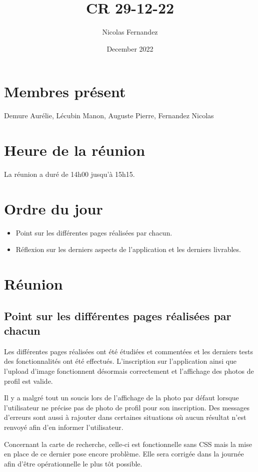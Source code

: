 \documentclass{report}
\title{CR 29-12-22}
\author{Nicolas Fernandez}
\date{December 2022}
\begin{document}
\maketitle

\section{Membres présent}
Demure Aurélie, Lécubin Manon, Auguste Pierre, Fernandez Nicolas

\section{Heure de la réunion}

La réunion a duré de 14h00 jusqu'à 15h15.

\section{Ordre du jour}

\begin{itemize}
    \item Point sur les différentes pages réalisées par chacun.
    \item Réflexion sur les derniers aspects de l'application et les derniers livrables.
\end{itemize}

\section{Réunion}
\subsection{Point sur les différentes pages réalisées par chacun}

Les différentes pages réalisées ont été étudiées et commentées et les derniers tests des fonctionnalités ont été effectués. L'inscription sur l'application ainsi que l'upload d'image fonctionnent désormais correctement et l'affichage des photos de profil est valide. 

Il y a malgré tout un soucis lors de l'affichage de la photo par défaut lorsque l'utilisateur ne précise pas de photo de profil pour son inscription. Des messages d'erreurs sont aussi à rajouter dans certaines situations où aucun résultat n'est renvoyé afin d'en informer l'utilisateur.

Concernant la carte de recherche, celle-ci est fonctionnelle sans CSS mais la mise en place de ce dernier pose encore problème. Elle sera corrigée dans la journée afin d'être opérationnelle le plus tôt possible.
\end{document}
